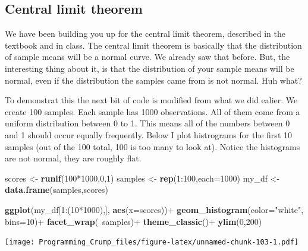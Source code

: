 \documentclass[]{book}
\newenvironment{Shaded}{\begin{snugshade}}{\end{snugshade}}
\newcommand{\KeywordTok}[1]{\textcolor[rgb]{0.13,0.29,0.53}{\textbf{{#1}}}}
\newcommand{\DataTypeTok}[1]{\textcolor[rgb]{0.13,0.29,0.53}{{#1}}}
\newcommand{\DecValTok}[1]{\textcolor[rgb]{0.00,0.00,0.81}{{#1}}}
\newcommand{\StringTok}[1]{\textcolor[rgb]{0.31,0.60,0.02}{{#1}}}
\newcommand{\NormalTok}[1]{{#1}}
\theoremstyle{definition}
\theoremstyle{definition}
\theoremstyle{definition}
\theoremstyle{remark}
\begin{document}
\subsection{Central limit theorem}\label{central-limit-theorem}

We have been building you up for the central limit theorem, described in
the textbook and in class. The central limit theorem is basically that
the distribution of sample means will be a normal curve. We already saw
that before. But, the interesting thing about it, is that the
distribution of your sample means will be normal, even if the
distribution the samples came from is not normal. Huh what?

To demonstrat this the next bit of code is modified from what we did
ealier. We create 100 samples. Each sample has 1000 observations. All of
them come from a uniform distribution between 0 to 1. This means all of
the numbers between 0 and 1 should occur equally frequently. Below I
plot histrograms for the first 10 samples (out of the 100 total, 100 is
too many to look at). Notice the histograms are not normal, they are
roughly flat.

\begin{Shaded}
\begin{Highlighting}[]
\NormalTok{scores <-}\StringTok{ }\KeywordTok{runif}\NormalTok{(}\DecValTok{100}\NormalTok{*}\DecValTok{1000}\NormalTok{,}\DecValTok{0}\NormalTok{,}\DecValTok{1}\NormalTok{)}
\NormalTok{samples <-}\StringTok{ }\KeywordTok{rep}\NormalTok{(}\DecValTok{1}\NormalTok{:}\DecValTok{100}\NormalTok{,}\DataTypeTok{each=}\DecValTok{1000}\NormalTok{)}
\NormalTok{my_df <-}\StringTok{ }\KeywordTok{data.frame}\NormalTok{(samples,scores)}

\KeywordTok{ggplot}\NormalTok{(my_df[}\DecValTok{1}\NormalTok{:(}\DecValTok{10}\NormalTok{*}\DecValTok{1000}\NormalTok{),], }\KeywordTok{aes}\NormalTok{(}\DataTypeTok{x=}\NormalTok{scores))+}
\StringTok{  }\KeywordTok{geom_histogram}\NormalTok{(}\DataTypeTok{color=}\StringTok{"white"}\NormalTok{, }\DataTypeTok{bins=}\DecValTok{10}\NormalTok{)+}
\StringTok{  }\KeywordTok{facet_wrap}\NormalTok{(~samples)+}
\StringTok{  }\KeywordTok{theme_classic}\NormalTok{()+}
\StringTok{  }\KeywordTok{ylim}\NormalTok{(}\DecValTok{0}\NormalTok{,}\DecValTok{200}\NormalTok{)}
\end{Highlighting}
\end{Shaded}

\texttt{[image: Programming\_Crump\_files/figure-latex/unnamed-chunk-103-1.pdf]}
\end{document}

